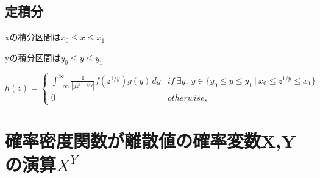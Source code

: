 \documentclass[a4paper,11pt]{ltjsarticle}
\begin{document}
\subsection{定積分}
\begin{description}
    \item xの積分区間は$x_0 \leq x \leq x_1$
    \item yの積分区間は$y_0 \leq y \leq y_1$
\end{description}
$$
    h(z)=
    \begin{cases}
        \int_{-\infty}^{\infty} \frac{1}{|yz^{1-1/y}|} f(z^{1/y}) g(y) \, dy    & if\ \exists y,\  y\in \{ y_0 \leq y \leq y_1 \ | \ x_0 \leq z^{1/y} \leq x_1 \}\\
        0                                                                       & otherwise,
    \end{cases}
$$
\newpage


\section{確率密度関数が離散値の確率変数X,Yの演算$X^Y$}
\end{document}
